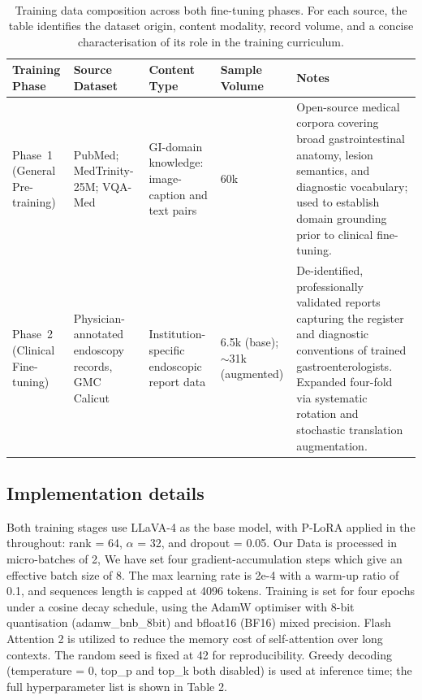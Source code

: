﻿﻿\documentclass[12pt]{report}
\begin{document}
\begin{table}[ht]
\centering
\caption{Training data composition across both fine-tuning phases. For each source, the table identifies the dataset origin, content modality, record volume, and a concise characterisation of its role in the training curriculum.}
\label{tab:data-distribution}
\renewcommand{\arraystretch}{1.2}
\begin{tabular}{p{1.8cm}p{2.8cm}p{2.5cm}p{1.5cm}p{4.0cm}}
\toprule
Training Phase & Source Dataset & Content Type & Sample Volume & Notes \\
\midrule
Phase~1 (General Pre-training) & PubMed; MedTrinity-25M; VQA-Med & GI-domain knowledge: image-caption and text pairs & 60k & Open-source medical corpora covering broad gastrointestinal anatomy, lesion semantics, and diagnostic vocabulary; used to establish domain grounding prior to clinical fine-tuning. \\
Phase~2 (Clinical Fine-tuning) & Physician-annotated endoscopy records, GMC Calicut & Institution-specific endoscopic report data & 6.5k (base); $\sim$31k (augmented) & De-identified, professionally validated reports capturing the register and diagnostic conventions of trained gastroenterologists. Expanded four-fold via systematic rotation and stochastic translation augmentation. \\
\bottomrule
\end{tabular}
\end{table}

\subsection{Implementation details}
Both training stages use LLaVA-4 as the base model, with P-LoRA applied in the  throughout: rank = 64, $\alpha$ = 32, and dropout = 0.05. Our Data is processed in micro-batches of 2, We have set four gradient-accumulation steps which give an effective batch size of 8. The max learning rate is 2e-4 with a warm-up ratio of 0.1, and sequences length is capped at 4096 tokens. Training is set for four epochs under a cosine decay schedule, using the AdamW optimiser with 8-bit quantisation (adamw\_bnb\_8bit) and bfloat16 (BF16) mixed precision. Flash Attention 2 is utilized to reduce the memory cost of self-attention over long contexts. The random seed is fixed at 42 for reproducibility. Greedy decoding (temperature = 0, top\_p and top\_k both disabled) is used at inference time; the full hyperparameter list is shown in Table 2.
\end{document}
